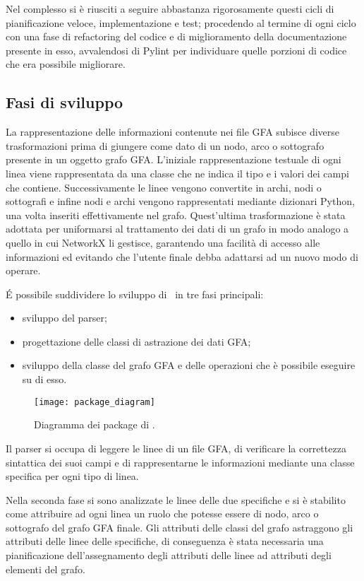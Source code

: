 Nel complesso si è riusciti a seguire abbastanza rigorosamente questi cicli
di pianificazione veloce, implementazione e test; procedendo al termine
di ogni ciclo con una fase di refactoring del codice e di miglioramento
della documentazione presente in esso, avvalendosi di Pylint per individuare
quelle porzioni di codice che era possibile migliorare.

\subsection{Fasi di sviluppo}
La rappresentazione delle informazioni contenute nei file GFA subisce
diverse trasformazioni prima di giungere come dato di un nodo, arco o
sottografo presente in un oggetto grafo GFA. L'iniziale rappresentazione
testuale di ogni linea viene rappresentata da una classe che ne indica
il tipo e i valori dei campi che contiene. Successivamente le linee
vengono convertite in archi, nodi o sottografi e infine nodi e archi
vengono rappresentati mediante dizionari Python, una volta inseriti
effettivamente nel grafo. Quest'ultima trasformazione è stata
adottata per uniformarsi al trattamento dei dati di un grafo in modo analogo
a quello in cui NetworkX li gestisce, garantendo una facilità di accesso
alle informazioni ed evitando che l'utente finale debba adattarsi ad un
nuovo modo di operare.

\'E possibile suddividere lo sviluppo di \pygfa \  in tre fasi principali:
\begin{itemize}
	\item sviluppo del parser;
	\item progettazione delle classi di astrazione dei dati GFA;
	\item sviluppo della classe del grafo GFA e delle operazioni che è
		possibile eseguire su di esso.
\end{itemize}
\captionsetup{justification=centering}
\begin{figure}[h]
	\centering
	\texttt{[image: package\_diagram]}
	\caption[Diagramma dei package]{Diagramma dei package di \pygfa.}
\end{figure}
\captionsetup{justification=justified}

Il parser si occupa di leggere le linee di un file GFA, di verificare la correttezza
sintattica dei suoi campi e di rappresentarne le informazioni mediante una classe
specifica per ogni tipo di linea.

Nella seconda fase si sono analizzate le linee delle due specifiche e si
è stabilito come attribuire ad ogni linea un ruolo che potesse essere di
nodo, arco o sottografo del grafo GFA finale. Gli attributi delle classi
del grafo astraggono gli attributi delle linee delle specifiche, 
di conseguenza è stata necessaria
una pianificazione dell'assegnamento degli attributi delle linee ad
attributi degli elementi del grafo.

